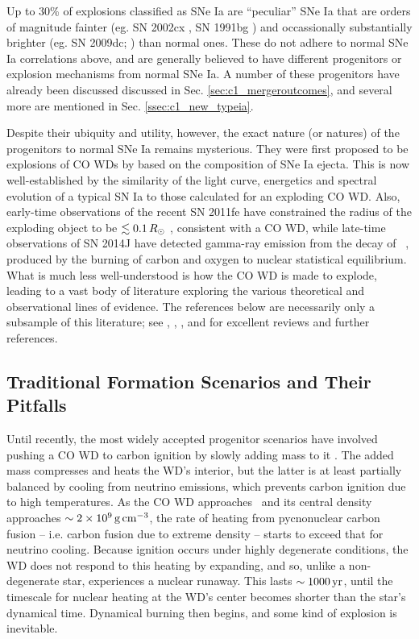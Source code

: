 Up to $30$\% \citep{li+11} of explosions classified as SNe Ia are ``peculiar'' SNe Ia that are orders of magnitude fainter (eg. SN 2002cx \citep{li+02, fole+13}, SN 1991bg \citep{mazz+97}) and occassionally substantially brighter (eg. SN 2009dc; \citealt{yama+09, taub+09}) than normal ones.  These do not adhere to normal SNe Ia correlations above, and are generally believed to have different progenitors or explosion mechanisms from normal SNe Ia.  A number of these progenitors have already been discussed discussed in Sec. \ref{sec:c1_mergeroutcomes}, and several more are mentioned in Sec. \ref{ssec:c1_new_typeia}.

Despite their ubiquity and utility, however, the exact nature (or natures) of the progenitors to normal SNe Ia remains mysterious.  They were first proposed to be explosions of CO WDs by \cite{hoylf60} based on the composition of SNe Ia ejecta.  This is now well-established by the similarity of the light curve, energetics and spectral evolution of a typical SN Ia to those calculated for an exploding CO WD.  Also, early-time observations of the recent SN 2011fe have constrained the radius of the exploding object to be $\lesssim0.1\,\Rsun$ \citep{nuge+11, bloo+12,maozmn14}, consistent with a CO WD, while late-time observations of SN 2014J have detected gamma-ray emission from the decay of \Ni\ \citep{chur+14}, produced by the burning of carbon and oxygen to nuclear statistical equilibrium.  What is much less well-understood is how the CO WD is made to explode, leading to a vast body of literature exploring the various theoretical and observational lines of evidence.  The references below are necessarily only a subsample of this literature; see \cite{howe11}, \cite{hill+13}, \cite{maozmn14}, and \cite{tsebs15} for excellent reviews and further references.

\subsection{Traditional Formation Scenarios and Their Pitfalls}
\label{ssec:c1_old_typeia}

Until recently, the most widely accepted progenitor scenarios have involved pushing a CO WD to carbon ignition by slowly adding mass to it \citep{hilln00}.  The added mass compresses and heats the WD's interior, but the latter is at least partially balanced by cooling from neutrino emissions, which prevents carbon ignition due to high temperatures.  As the CO WD approaches \Mch\ and its central density approaches $\sim2\times10^9\,\gcc$, the rate of heating from pycnonuclear carbon fusion -- i.e. carbon fusion due to extreme density -- starts to exceed that for neutrino cooling.  Because ignition occurs under highly degenerate conditions, the WD does not respond to this heating by expanding, and so, unlike a non-degenerate star, experiences a nuclear runaway.  This lasts $\sim1000\,\mathrm{yr}$, until the timescale for nuclear heating at the WD's center becomes shorter than the star's dynamical time.  Dynamical burning then begins, and some kind of explosion is inevitable.

